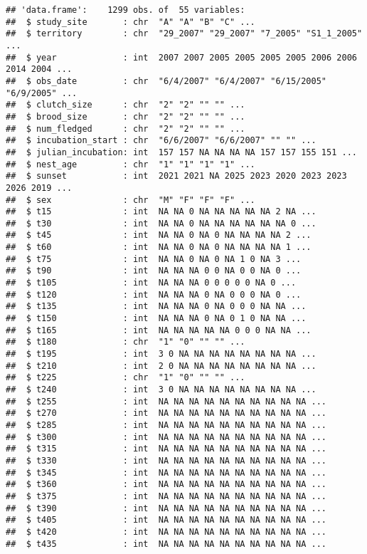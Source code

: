 \documentclass[
]{article}
\begin{document}
\begin{verbatim}
## 'data.frame':    1299 obs. of  55 variables:
##  $ study_site       : chr  "A" "A" "B" "C" ...
##  $ territory        : chr  "29_2007" "29_2007" "7_2005" "S1_1_2005" ...
##  $ year             : int  2007 2007 2005 2005 2005 2005 2006 2006 2014 2004 ...
##  $ obs_date         : chr  "6/4/2007" "6/4/2007" "6/15/2005" "6/9/2005" ...
##  $ clutch_size      : chr  "2" "2" "" "" ...
##  $ brood_size       : chr  "2" "2" "" "" ...
##  $ num_fledged      : chr  "2" "2" "" "" ...
##  $ incubation_start : chr  "6/6/2007" "6/6/2007" "" "" ...
##  $ julian_incubation: int  157 157 NA NA NA NA 157 157 155 151 ...
##  $ nest_age         : chr  "1" "1" "1" "1" ...
##  $ sunset           : int  2021 2021 NA 2025 2023 2020 2023 2023 2026 2019 ...
##  $ sex              : chr  "M" "F" "F" "F" ...
##  $ t15              : int  NA NA 0 NA NA NA NA NA 2 NA ...
##  $ t30              : int  NA NA 0 NA NA NA NA NA NA 0 ...
##  $ t45              : int  NA NA 0 NA 0 NA NA NA NA 2 ...
##  $ t60              : int  NA NA 0 NA 0 NA NA NA NA 1 ...
##  $ t75              : int  NA NA 0 NA 0 NA 1 0 NA 3 ...
##  $ t90              : int  NA NA NA 0 0 NA 0 0 NA 0 ...
##  $ t105             : int  NA NA NA 0 0 0 0 0 NA 0 ...
##  $ t120             : int  NA NA NA 0 NA 0 0 0 NA 0 ...
##  $ t135             : int  NA NA NA 0 NA 0 0 0 NA NA ...
##  $ t150             : int  NA NA NA 0 NA 0 1 0 NA NA ...
##  $ t165             : int  NA NA NA NA NA 0 0 0 NA NA ...
##  $ t180             : chr  "1" "0" "" "" ...
##  $ t195             : int  3 0 NA NA NA NA NA NA NA NA ...
##  $ t210             : int  2 0 NA NA NA NA NA NA NA NA ...
##  $ t225             : chr  "1" "0" "" "" ...
##  $ t240             : int  3 0 NA NA NA NA NA NA NA NA ...
##  $ t255             : int  NA NA NA NA NA NA NA NA NA NA ...
##  $ t270             : int  NA NA NA NA NA NA NA NA NA NA ...
##  $ t285             : int  NA NA NA NA NA NA NA NA NA NA ...
##  $ t300             : int  NA NA NA NA NA NA NA NA NA NA ...
##  $ t315             : int  NA NA NA NA NA NA NA NA NA NA ...
##  $ t330             : int  NA NA NA NA NA NA NA NA NA NA ...
##  $ t345             : int  NA NA NA NA NA NA NA NA NA NA ...
##  $ t360             : int  NA NA NA NA NA NA NA NA NA NA ...
##  $ t375             : int  NA NA NA NA NA NA NA NA NA NA ...
##  $ t390             : int  NA NA NA NA NA NA NA NA NA NA ...
##  $ t405             : int  NA NA NA NA NA NA NA NA NA NA ...
##  $ t420             : int  NA NA NA NA NA NA NA NA NA NA ...
##  $ t435             : int  NA NA NA NA NA NA NA NA NA NA ...

\end{verbatim}
\end{document}

